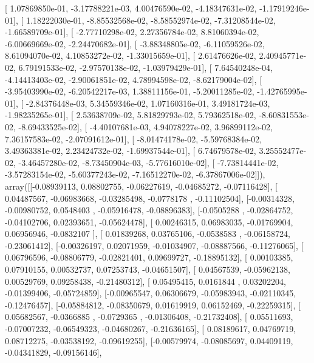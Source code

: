 \documentclass{article}
\begin{document}
       [  1.07869850e-01,  -3.17788221e-03,   4.00476590e-02,
         -4.18347631e-02,  -1.17919246e-01],
       [  1.18222030e-01,  -8.85532568e-02,  -8.58552974e-02,
         -7.31208544e-02,  -1.66589709e-01],
       [ -2.77710298e-02,   2.27356784e-02,   8.81060394e-02,
         -6.00669669e-02,  -2.24470682e-01],
       [ -3.88348805e-02,  -6.11059526e-02,   8.61094070e-02,
          4.10853272e-02,  -1.33015659e-01],
       [  2.61476626e-02,   2.40945771e-02,   6.79191533e-02,
         -2.97570138e-02,  -1.03979429e-01],
       [  7.64540248e-04,  -4.14413403e-02,  -2.90061851e-02,
          4.78994598e-02,  -8.62179004e-02],
       [ -3.95403990e-02,  -6.20542217e-03,   1.38811156e-01,
         -5.20011285e-02,  -1.42765995e-01],
       [ -2.84376448e-03,   5.34559346e-02,   1.07160316e-01,
          3.49181724e-03,  -1.98235265e-01],
       [  2.53638709e-02,   5.81829793e-02,   5.79362518e-02,
         -8.60831553e-02,  -8.69433525e-02],
       [ -4.40107681e-03,   4.94078227e-02,   3.96899112e-02,
          7.36157583e-02,  -2.07091612e-01],
       [ -8.01474178e-02,  -5.59768384e-02,   3.49363381e-02,
          2.23424732e-02,  -1.69937544e-01],
       [  6.74679578e-02,   3.25552477e-02,  -3.46457280e-02,
         -8.73450904e-03,  -5.77616010e-02],
       [ -7.73814441e-02,  -3.57283154e-02,  -5.60377243e-02,
         -7.16512270e-02,  -6.37867006e-02]]), array([[-0.08939113,  0.08802755, -0.06227619, -0.04685272, -0.07116428],
       [ 0.04487567, -0.06983668, -0.03285498, -0.0778178 , -0.11102504],
       [-0.00314328, -0.00980752,  0.0548403 , -0.05916478, -0.08896383],
       [-0.0505288 , -0.02864752, -0.04102706,  0.02393651, -0.05624478],
       [ 0.00246315,  0.06983035, -0.01769904,  0.06956946, -0.0832107 ],
       [ 0.01839268,  0.03765106, -0.0538583 , -0.06158724, -0.23061412],
       [-0.00326197,  0.02071959, -0.01034907, -0.08887566, -0.11276065],
       [ 0.06796596, -0.08806779, -0.02821401,  0.09699727, -0.18895132],
       [ 0.00103385,  0.07910155,  0.00532737,  0.07253743, -0.04651507],
       [ 0.04567539, -0.05962138,  0.00529769,  0.09258438, -0.21480312],
       [ 0.05495415,  0.0161844 ,  0.03202204, -0.01399406, -0.05724859],
       [-0.00965547,  0.06306679, -0.05983943, -0.02110345, -0.12476457],
       [-0.05884812, -0.08350679,  0.01619919,  0.06152469, -0.22259315],
       [ 0.05682567, -0.0366885 , -0.0729365 , -0.01306408, -0.21732408],
       [ 0.05511693, -0.07007232, -0.06549323, -0.04680267, -0.21636165],
       [ 0.08189617,  0.04769719,  0.08712275, -0.03538192, -0.09619255],
       [-0.00579974, -0.08085697,  0.04409119, -0.04341829, -0.09156146],
\end{document}
